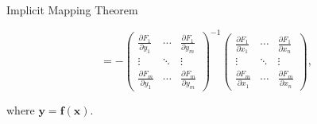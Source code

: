 \documentclass[11pt]{../../TexTemplate/elegantbook}
\begin{document}
\begin{theorem}{Implicit Mapping Theorem}
\begin{enumerate}
\[        = -
        \begin{pmatrix}
            \frac{\partial F_1}{\partial y_1} & \cdots & \frac{\partial F_1}{\partial y_m} \\
            \vdots & \ddots & \vdots \\
            \frac{\partial F_m}{\partial y_1} & \cdots & \frac{\partial F_m}{\partial y_m}
        \end{pmatrix}^{-1}
        \begin{pmatrix}
            \frac{\partial F_1}{\partial x_1} & \cdots & \frac{\partial F_1}{\partial x_n} \\
            \vdots & \ddots & \vdots \\
            \frac{\partial F_m}{\partial x_1} & \cdots & \frac{\partial F_m}{\partial x_n}
        \end{pmatrix},
        \]
    \end{enumerate}
    where \( \mathbf{y} = \mathbf{f}(\mathbf{x}) \).
\end{theorem}
\end{document}
